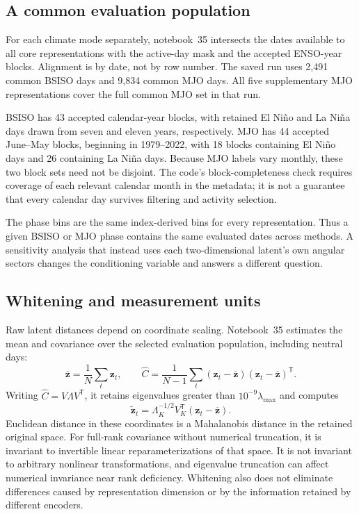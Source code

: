 \documentclass[11pt]{article}
\begin{document}
\subsection{A common evaluation population}

For each climate mode separately, notebook~35 intersects the dates available to all core representations with the active-day mask and the accepted ENSO-year blocks. Alignment is by date, not by row number. The saved run uses 2,491 common BSISO days and 9,834 common MJO days. All five supplementary MJO representations cover the full common MJO set in that run.

BSISO has 43 accepted calendar-year blocks, with retained El Ni\~no and La Ni\~na days drawn from seven and eleven years, respectively. MJO has 44 accepted June--May blocks, beginning in 1979--2022, with 18 blocks containing El Ni\~no days and 26 containing La Ni\~na days. Because MJO labels vary monthly, these two block sets need not be disjoint. The code's block-completeness check requires coverage of each relevant calendar month in the metadata; it is not a guarantee that every calendar day survives filtering and activity selection.

The phase bins are the same index-derived bins for every representation. Thus a given BSISO or MJO phase contains the same evaluated dates across methods. A sensitivity analysis that instead uses each two-dimensional latent's own angular sectors changes the conditioning variable and answers a different question.

\subsection{Whitening and measurement units}

Raw latent distances depend on coordinate scaling. Notebook~35 estimates the mean and covariance over the selected evaluation population, including neutral days:
\begin{equation}
\overline{\mathbf z}=\frac{1}{N}\sum_t\mathbf z_t,
\qquad
\widehat C=\frac{1}{N-1}\sum_t
(\mathbf z_t-\overline{\mathbf z})(\mathbf z_t-\overline{\mathbf z})^\mathsf T.
\end{equation}
Writing $\widehat C=V\Lambda V^\mathsf T$, it retains eigenvalues greater than $10^{-9}\lambda_{\max}$ and computes
\begin{equation}
\widetilde{\mathbf z}_t=
\Lambda_K^{-1/2}V_K^\mathsf T(\mathbf z_t-\overline{\mathbf z}).
\label{eq:whiten}
\end{equation}
Euclidean distance in these coordinates is a Mahalanobis distance in the retained original space. For full-rank covariance without numerical truncation, it is invariant to invertible linear reparameterizations of that space. It is not invariant to arbitrary nonlinear transformations, and eigenvalue truncation can affect numerical invariance near rank deficiency. Whitening also does not eliminate differences caused by representation dimension or by the information retained by different encoders.
\end{document}
